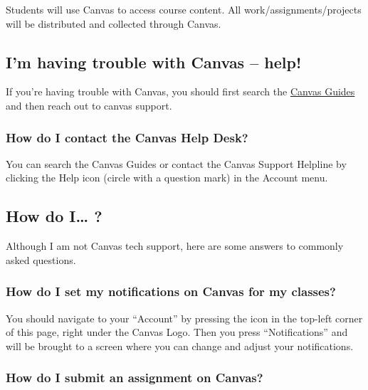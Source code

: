 Students will use Canvas to access course content.
All work/assignments/projects will be distributed and collected through Canvas.

\hypertarget{im-having-trouble-with-canvas-help}{%
\subsection{I'm having trouble with Canvas -- help!}\label{im-having-trouble-with-canvas-help}}

If you're having trouble with Canvas, you should first search the \href{https://community.canvaslms.com/t5/Canvas-Basics-Guide/tkb-p/basics}{Canvas Guides} and then reach out to canvas support.

\hypertarget{how-do-i-contact-the-canvas-help-desk}{%
\subsubsection{How do I contact the Canvas Help Desk?}\label{how-do-i-contact-the-canvas-help-desk}}

You can search the Canvas Guides or contact the Canvas Support Helpline by clicking the Help icon (circle with a question mark) in the Account menu.

\hypertarget{how-do-i}{%
\subsection{How do I\ldots{} ?}\label{how-do-i}}

Although I am not Canvas tech support, here are some answers to commonly asked questions.

\hypertarget{how-do-i-set-my-notifications-on-canvas-for-my-classes}{%
\subsubsection{How do I set my notifications on Canvas for my classes?}\label{how-do-i-set-my-notifications-on-canvas-for-my-classes}}

You should navigate to your ``Account'' by pressing the icon in the top-left corner of this page, right under the Canvas Logo. Then you press ``Notifications'' and will be brought to a screen where you can change and adjust your notifications.

\hypertarget{how-do-i-submit-an-assignment-on-canvas}{%
\subsubsection{How do I submit an assignment on Canvas?}\label{how-do-i-submit-an-assignment-on-canvas}}

